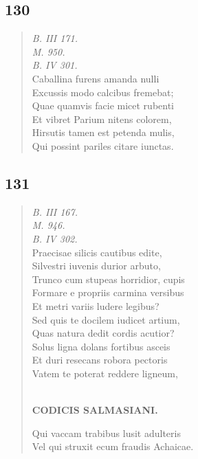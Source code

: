 \documentclass[11pt, a4paper]{report}
\begin{document}
            \subsection*{130}
      \begin{verse}
      \textit{B. III 171.} \\ \textit{M. 950.} \\ \textit{B. IV 301.} \\ Caballina furens amanda nulli \\ Excussis modo calcibus fremebat; \\ Quae quamvis facie micet rubenti \\ Et vibret Parium nitens colorem, \\ Hirsutis tamen est petenda mulis, \\ Qui possint pariles citare iunctas. \\ 
      \end{verse}
  
            \subsection*{131}
      \begin{verse}
      \textit{B. III 167.} \\ \textit{M. 946.} \\ \textit{B. IV 302.} \\ Praecisae silicis cautibus edite, \\ Silvestri iuvenis durior arbuto, \\ Trunco cum stupeas horridior, cupis \\ Formare e propriis carmina versibus \\ Et metri variis ludere legibus? \\ Sed quis te docilem iudicet artium, \\ Quas natura dedit cordis acutior? \\ Solus ligna dolans fortibus asceis \\ Et duri resecans robora pectoris \\ Vatem te poterat reddere ligneum, \\ 
        ﻿\pagebreak 
    \begin{center} \textbf{CODICIS SALMASIANI.} \end{center} \marginpar{[139]} Qui vaccam trabibus lusit adulteris \\ Vel qui struxit ecum fraudis Achaicae. \\ 
      \end{verse}
  
\end{document}
